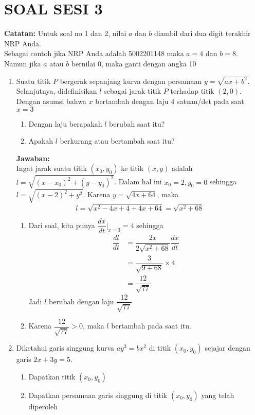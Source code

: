 \documentclass{article}
\begin{document}
\section*{SOAL SESI 3}
\textbf{Catatan:} Untuk soal no 1 dan 2, nilai $a$ dan $b$ diambil dari dua digit terakhir NRP Anda. \\
Sebagai contoh jika NRP Anda adalah 5002201148 maka $a=4$ dan $b=8$.\\
Namun jika $a$ atau $b$ bernilai 0, maka ganti dengan angka 10
\begin{enumerate}
	\item Suatu titik $P$ bergerak sepanjang kurva dengan persamaan $y=\sqrt{ax+b^2}$. Selanjutnya, didefinisikan $l$ sebagai jarak titik $P$ terhadap titik $(2,0)$. Dengan asumsi bahwa $x$ bertambah dengan laju 4 satuan/det pada saat $x=3$
	\begin{enumerate}
		\item Dengan laju berapakah $l$ berubah saat itu?
		\item Apakah $l$ berkurang atau bertambah saat itu?
	\end{enumerate}
	\textbf{Jawaban:}\\
	Ingat jarak suatu titik $(x_0,y_0)$ ke titik $(x,y)$ adalah $l=\sqrt{(x-x_0)^2+(y-y_0)^2}$. Dalam hal ini $x_0=2,y_0=0$ sehingga $l=\sqrt{(x-2)^2+y^2}$. Karena $y=\sqrt{4x+64}$, maka $$l=\sqrt{x^2-4x+4+4x+64}=\sqrt{x^2+68}$$
	\begin{enumerate}
		\item Dari soal, kita punya $\dfrac{dx}{dt}\bigg|_{x=3} = 4$ sehingga 
		\begin{align*}
		\dfrac{dl}{dt} &= \dfrac{2x}{2\sqrt{x^2+68}}\dfrac{dx}{dt}\\
		&= \dfrac{3}{\sqrt{9+68}}\times 4\\
		&= \dfrac{12}{\sqrt{77}}
		\end{align*}
	Jadi $l$ berubah dengan laju $\dfrac{12}{\sqrt{77}}$
	\item Karena $\dfrac{12}{\sqrt{77}}>0$, maka $l$ bertambah pada saat itu.
	\end{enumerate}
	\item Diketahui garis singgung kurva $ay^3=bx^2$ di titik $(x_0,y_0)$ sejajar dengan garis $2x+3y=5$.
	\begin{enumerate}
		\item Dapatkan titik $(x_0,y_0)$
		\item Dapatkan persamaan garis singgung di titik $(x_0,y_0)$ yang telah diperoleh 
	\end{enumerate}

\end{enumerate}
\end{document}
